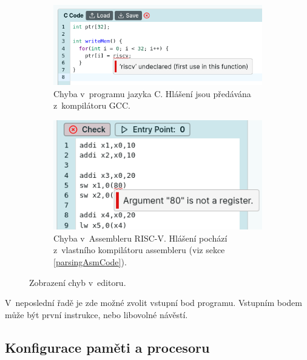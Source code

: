 \begin{figure}
     \centering
     \begin{subfigure}[b]{0.56\textwidth}
         \centering
         \includegraphics[width=\textwidth]{obrazky-figures/impl/c_error.png}
         \caption{Chyba v~programu jazyka C. Hlášení jsou předávána z~kompilátoru GCC.}
         \label{fig:codeerrors1}
     \end{subfigure}
     \hfill
     \begin{subfigure}[b]{0.42\textwidth}
         \centering
         \includegraphics[width=\textwidth]{obrazky-figures/impl/asm_error.png}
         \caption{Chyba v~Assembleru RISC-V. Hlášení pochází z~vlastního kompilátoru assembleru (viz sekce \ref{parsingAsmCode}).}
         \label{fig:codeerrors2}
     \end{subfigure}
        \caption{Zobrazení chyb v~editoru.}
        \label{codeerrors}
\end{figure}


V~neposlední řadě je zde možné zvolit vstupní bod programu.
Vstupním bodem může být první instrukce, nebo libovolné návěstí.

\subsection{Konfigurace paměti a procesoru}

